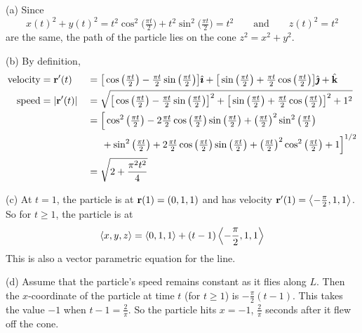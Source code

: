 \begin{solution} (a)
Since
\begin{equation*}
x(t)^2+y(t)^2=t^2\cos^2\big(\tfrac{\pi t}{2}\big)
   +t^2\sin^2\big(\tfrac{\pi t}{2}\big)=t^2\qquad\text{and}\qquad
z(t)^2=t^2
\end{equation*}
are the same, the path of the particle lies on the cone $z^2=x^2+y^2$.

(b) By definition,
\begin{alignat*}{3}
\text{velocity}&=\mathbf{r}'(t)&&= \big[\cos\big(\tfrac{\pi t}{2}\big)
           -\tfrac{\pi t}{2}\sin\big(\tfrac{\pi t}{2}\big)\big]\hat{\pmb{\imath}}
         +\big[\sin\big(\tfrac{\pi t}{2}\big)
           +\tfrac{\pi t}{2}\cos\big(\tfrac{\pi t}{2}\big)\big]\hat{\pmb{\jmath}} +\hat{\mathbf{k}} \\
\text{speed}&=|\mathbf{r}'(t)|&&=
\sqrt{\big[\cos\big(\tfrac{\pi t}{2}\big)
           -\tfrac{\pi t}{2}\sin\big(\tfrac{\pi t}{2}\big)\big]^2
         +\big[\sin\big(\tfrac{\pi t}{2}\big)
           +\tfrac{\pi t}{2}\cos\big(\tfrac{\pi t}{2}\big)\big]^2 +1^2} \\
& &&=
   \Big[\cos^2\big(\tfrac{\pi t}{2}\big)
          -2\tfrac{\pi t}{2}\cos\big(\tfrac{\pi t}{2}\big)
               \sin\big(\tfrac{\pi t}{2}\big)
           +\big(\tfrac{\pi t}{2}\big)^2\sin^2\big(\tfrac{\pi t}{2}\big) \\
& &&\hskip.2in         +\sin^2\big(\tfrac{\pi t}{2}\big)
           +2\tfrac{\pi t}{2}\cos\big(\tfrac{\pi t}{2}\big)
               \sin\big(\tfrac{\pi t}{2}\big)
  +\big(\tfrac{\pi t}{2}\big)^2\cos^2\big(\tfrac{\pi t}{2}\big) +1\Big]^{1/2}\\
& &&=\sqrt{2+\frac{\pi^2 t^2}{4}}
\end{alignat*}

(c) At $t=1$, the particle is at $\mathbf{r}(1)=(0,1,1)$ and has velocity
$\mathbf{r}'(1)=\left< -\frac{\pi}{2},1,1\right>$. So for $t\ge 1$, the particle 
is at 
\begin{equation*}
   \left< x,y,z\right> = \left< 0,1,1\right>+(t-1)\left< -\frac{\pi}{2},1,1\right>
\end{equation*}
This is also a vector parametric equation for the line.

(d) Assume that the particle's speed remains constant as it flies along $L$.
Then the $x$-coordinate of the particle at time $t$ (for $t\ge 1$)
is  $-\frac{\pi}{2}(t-1)$. This takes the value $-1$ when $t-1=\frac{2}{\pi}$.
So the particle hits $x=-1$, $\frac{2}{\pi}$ seconds after it
flew off the cone.
\end{solution}

